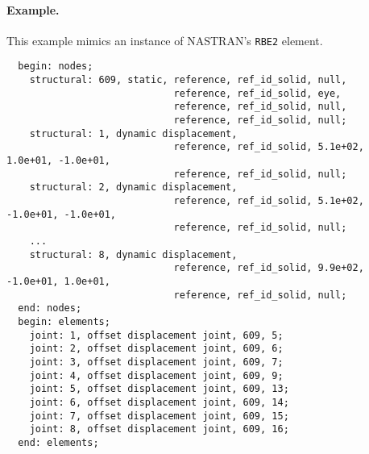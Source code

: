 \paragraph{Example.}
This example mimics an instance of NASTRAN's \texttt{RBE2} element.
\begin{Verbatim}
  begin: nodes;
    structural: 609, static, reference, ref_id_solid, null,
                             reference, ref_id_solid, eye,
                             reference, ref_id_solid, null,
                             reference, ref_id_solid, null;
    structural: 1, dynamic displacement,
                             reference, ref_id_solid, 5.1e+02,  1.0e+01, -1.0e+01,
                             reference, ref_id_solid, null;
    structural: 2, dynamic displacement,
                             reference, ref_id_solid, 5.1e+02,  -1.0e+01, -1.0e+01,
                             reference, ref_id_solid, null;
    ...
    structural: 8, dynamic displacement,
                             reference, ref_id_solid, 9.9e+02,  -1.0e+01, 1.0e+01,
                             reference, ref_id_solid, null;
  end: nodes;
  begin: elements;
    joint: 1, offset displacement joint, 609, 5;
    joint: 2, offset displacement joint, 609, 6;
    joint: 3, offset displacement joint, 609, 7;
    joint: 4, offset displacement joint, 609, 9;
    joint: 5, offset displacement joint, 609, 13;
    joint: 6, offset displacement joint, 609, 14;
    joint: 7, offset displacement joint, 609, 15;
    joint: 8, offset displacement joint, 609, 16;
  end: elements;
\end{Verbatim}

